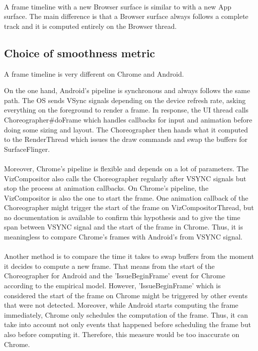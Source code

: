 \documentclass{kththesis}
\begin{document}
\paragraph{}
A frame timeline with a new Browser surface is similar to with a new App surface. The main difference is that a Browser surface always follows a complete track and it is computed entirely on the Browser thread.
\subsection{Choice of smoothness metric}
\label{results:metric}

A frame timeline is very different on Chrome and Android. 

On the one hand, Android's pipeline is synchronous and always follows the same path. The OS sends VSync signals depending on the device refresh rate, asking everything on the foreground to render a frame. In response, the UI thread calls Choreographer\#doFrame which handles callbacks for input and animation before doing some sizing and layout. The Choreographer then hands what it computed to the RenderThread which issues the draw commands and swap the buffers for SurfaceFlinger.

\paragraph{}
 Moreover, Chrome's pipeline is flexible and depends on a lot of parameters. The VizCompositor also calls the Choreographer regularly after VSYNC signals but stop the process at animation callbacks. On Chrome's pipeline, the VizCompositor is also the one to start the frame. One animation callback of the Choreographer might trigger the start of the frame on VizCompositorThread, but no documentation is available to confirm this hypothesis and to give the time span between VSYNC signal and the start of the frame in Chrome. \newline
Thus, it is meaningless to compare Chrome's frames with Android's from VSYNC signal.

\paragraph{}
Another method is to compare the time it takes to swap buffers from the moment it decides to compute a new frame. That means from the start of the Choreographer for Android and the 'IssueBeginFrame' event for Chrome according to the empirical model. However, 'IssueBeginFrame' which is considered the start of the frame on Chrome might be triggered by other events that were not detected. Moreover, while Android starts computing the frame immediately, Chrome only schedules the computation of the frame. Thus, it can take into account not only events that happened before scheduling the frame but also before computing it.  
Therefore, this measure would be too inaccurate on Chrome. \newline
\end{document}
